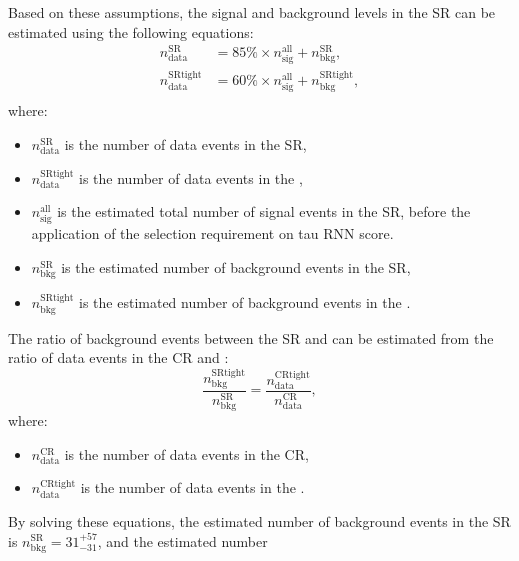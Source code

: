         Based on these assumptions, the signal and background levels in the SR can be 
        estimated using the following equations:
        \begin{equation}\begin{split}
            n^\mathrm{SR}_\mathrm{data} &= 85\% \times n^\mathrm{all}_\mathrm{sig} + n^\mathrm{SR}_\mathrm{bkg}, \\
            n^\mathrm{SRtight}_\mathrm{data} &= 60\% \times n^\mathrm{all}_\mathrm{sig} + n^\mathrm{SRtight}_\mathrm{bkg}, \\
        \end{split}\end{equation}
        where:
        \begin{itemize}
            \item \( n^\mathrm{SR}_\mathrm{data} \) is the number of data events in the SR,
            \item \( n^\mathrm{SRtight}_\mathrm{data} \) is the number of data events in the \SRtight,
            \item \( n^\mathrm{all}_\mathrm{sig} \) is the estimated total number of signal events in the SR, before the application of the selection requirement on tau RNN score.
            \item \( n^\mathrm{SR}_\mathrm{bkg} \) is the estimated number of background events in the SR,
            \item \( n^\mathrm{SRtight}_\mathrm{bkg} \) is the estimated number of background events in the \SRtight.
        \end{itemize}
        The ratio of background events between the SR and \SRtight can be estimated from the ratio of data events in the CR and \CRtight:
        \begin{equation}
            \frac{n^\mathrm{SRtight}_\mathrm{bkg}}{n^\mathrm{SR}_\mathrm{bkg}} = \frac{n^\mathrm{CRtight}_\mathrm{data}}{n^\mathrm{CR}_\mathrm{data}},
        \end{equation}
        where:
        \begin{itemize}
            \item \( n^\mathrm{CR}_\mathrm{data} \) is the number of data events in the CR,
            \item \( n^\mathrm{CRtight}_\mathrm{data} \) is the number of data events in the \CRtight.
        \end{itemize}
        By solving these equations, the estimated number of background events in the SR 
        is \( n^\mathrm{SR}_\mathrm{bkg} = 31^{+57}_{-31} \), and the estimated number 
